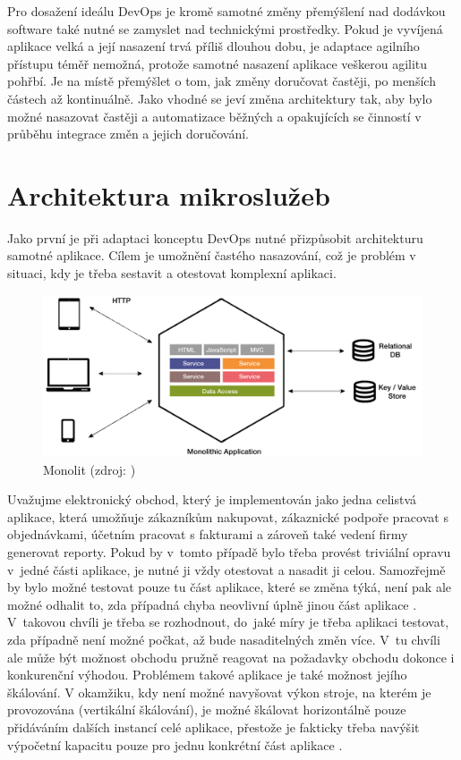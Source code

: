\documentclass[FM,DP]{tulthesis}
\begin{document}
Pro dosažení ideálu DevOps je kromě samotné změny přemýšlení nad dodávkou software také nutné se zamyslet
nad technickými prostředky. Pokud je vyvíjená aplikace velká a její nasazení trvá příliš dlouhou dobu, 
je adaptace agilního přístupu téměř nemožná, protože samotné nasazení aplikace veškerou agilitu pohřbí.
Je na místě přemýšlet o tom, jak změny doručovat častěji, po menších částech až kontinuálně. Jako vhodné
se jeví změna architektury tak, aby bylo možné nasazovat častěji a automatizace běžných a opakujících se
činností v průběhu integrace změn a jejich doručování.

\section{Architektura mikroslužeb}

Jako první je při adaptaci konceptu DevOps nutné přizpůsobit architekturu samotné aplikace. Cílem
je umožnění častého nasazování, což je problém v situaci, kdy je třeba sestavit a otestovat komplexní
aplikaci.

\begin{figure}[h]
\center
\includegraphics[width=\textwidth]{monolith.png}
\caption{Monolit (zdroj: \cite{monolith})}
\label{monolith}
\end{figure}

Uvažujme elektronický obchod, který je implementován jako jedna celistvá aplikace, která umožňuje
zákazníkům nakupovat, zákaznické podpoře pracovat s objednávkami, účetním pracovat s fakturami
a zároveň také vedení firmy generovat reporty. Pokud by v~tomto případě bylo třeba provést triviální 
opravu v~jedné části aplikace, je nutné ji vždy otestovat a nasadit ji celou. Samozřejmě by bylo možné
testovat pouze tu část aplikace, které se změna týká, není pak ale možné odhalit to, zda případná chyba
neovlivní úplně jinou část aplikace \cite[strana~77]{devops}. V~takovou chvíli je třeba se rozhodnout, do~jaké 
míry je třeba aplikaci testovat, zda případně není možné počkat, až bude nasaditelných změn více. V~tu chvíli 
ale může být možnost obchodu pružně reagovat na požadavky obchodu dokonce i konkurenční výhodou.
Problémem takové aplikace je také možnost jejího škálování. V okamžiku, kdy není možné navyšovat
výkon stroje, na kterém je provozována (vertikální škálování), je možné škálovat horizontálně pouze 
přidáváním dalších instancí celé aplikace, přestože je fakticky třeba navýšit výpočetní kapacitu pouze 
pro jednu konkrétní část aplikace \cite[strana~78]{devops}.
\end{document}
